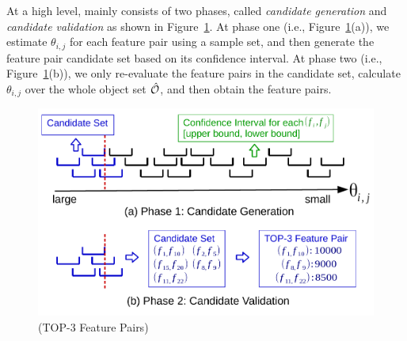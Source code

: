  At a high level, \sampling mainly consists of two phases, called {\em candidate generation} and {\em candidate validation} as shown in Figure~\ref{fig:sampling}. At phase one (i.e., Figure~\ref{fig:sampling}(a)), we estimate $\theta_{i,j}$ for each feature pair using a sample set, and then generate the feature pair candidate set based on its confidence interval. At phase two (i.e., Figure~\ref{fig:sampling}(b)), we only re-evaluate the feature pairs in the candidate set, calculate $\theta_{i,j}$ over the whole object set $\hat{\oo}$, and then obtain the \topk feature pairs. %
\begin{figure}[t!]
  \centering
  \vspace{-2mm}
  \includegraphics[width=\linewidth]{fig/sampling.pdf}
  \vspace{-9mm}
\caption{\sampling (TOP-3 Feature Pairs)}
\vspace{-5mm}
\label{fig:sampling}
\end{figure} 

